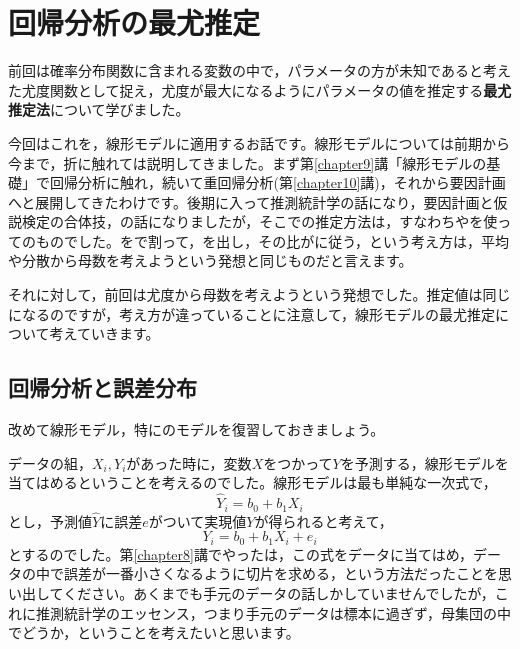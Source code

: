 \documentclass{ltjbook}
\begin{document}
\chapter{回帰分析の最尤推定}
\label{chapter24}
前回は確率分布関数に含まれる変数の中で，パラメータの方が未知であると考えた尤度関数として捉え，尤度が最大になるようにパラメータの値を推定する\textbf{最尤推定法}について学びました。

今回はこれを，線形モデルに適用するお話です。線形モデルについては前期から今まで，折に触れては説明してきました。まず第\ref{chapter9}講「線形モデルの基礎」で回帰分析に触れ，続いて重回帰分析(第\ref{chapter10}講)，それから要因計画へと展開してきたわけです。後期に入って推測統計学の話になり，要因計画と仮説検定の合体技，の話になりましたが，そこでの推定方法は，すなわちやを使ってのものでした。をで割って，を出し，その比がに従う，という考え方は，平均や分散から母数を考えようという発想と同じものだと言えます。

それに対して，前回は尤度から母数を考えようという発想でした。推定値は同じになるのですが，考え方が違っていることに注意して，線形モデルの最尤推定について考えていきます。

\section{回帰分析と誤差分布}
改めて線形モデル，特にのモデルを復習しておきましょう。

データの組，$X_i,Y_i$があった時に，変数$X$をつかって$Y$を予測する，線形モデルを当てはめるということを考えるのでした。線形モデルは最も単純な一次式で，
\[\hat{Y}_i = b_0 + b_1 X_i \]
 とし，予測値$\hat{Y}$に誤差$e$がついて実現値$Y$が得られると考えて，
 \[ Y_i= b_0 + b_1 X_i + e_i  \]
 とするのでした。第\ref{chapter8}講でやったは，この式をデータに当てはめ，データの中で誤差が一番小さくなるように切片を求める，という方法だったことを思い出してください。あくまでも手元のデータの話しかしていませんでしたが，これに推測統計学のエッセンス，つまり手元のデータは標本に過ぎず，母集団の中でどうか，ということを考えたいと思います。
\end{document}
